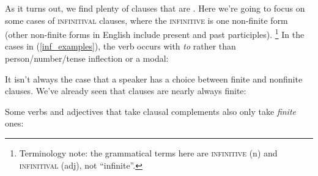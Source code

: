 \documentclass{article}
\begin{document}
As it turns out, we find plenty of clauses that are .
Here we're going to focus on some cases of \textsc{infinitival} clauses, where the \textsc{infinitive} is one non-finite form (other non-finite forms in English include present and past participles).%
\footnote{Terminology note: the grammatical terms here are \textsc{infinitive} (n) and \textsc{infinitival} (adj),
not ``infinite''.}
In the cases in (\ref{inf_examples}), the verb occurs with \emph{to} rather than person/number/tense inflection or a modal:
\begin{exe}
    \label{inf_examples}
\end{exe}

It isn't always the case that a speaker has a choice between finite and nonfinite clauses.
We've already seen that  clauses are nearly always finite:
\begin{exe}
\end{exe}
Some verbs and adjectives that take clausal complements also only take \textit{finite} ones:
\begin{exe}
\end{exe}
\end{document}
